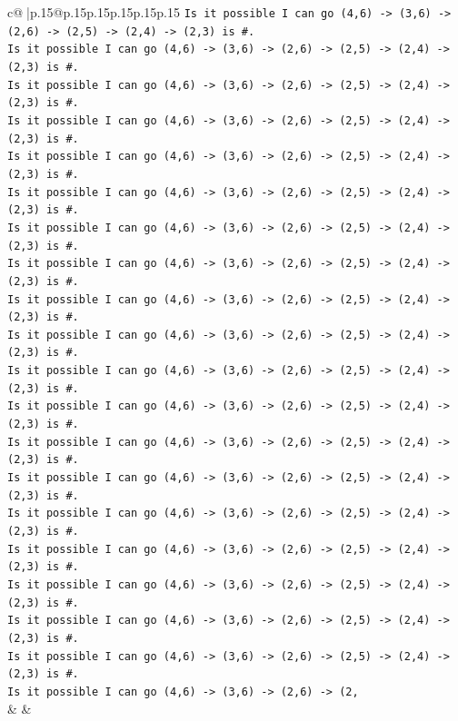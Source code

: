 \documentclass{article}
\begin{document}
{\begin{supertabular}{c@{$\;$}|p{.15\linewidth}@{}p{.15\linewidth}p{.15\linewidth}p{.15\linewidth}p{.15\linewidth}p{.15\linewidth}}
{{{\texttt{Is it possible I can go (4,6) {-}> (3,6) {-}> (2,6) {-}> (2,5) {-}> (2,4) {-}> (2,3) is \#.} \\
\texttt{Is it possible I can go (4,6) {-}> (3,6) {-}> (2,6) {-}> (2,5) {-}> (2,4) {-}> (2,3) is \#.} \\
\texttt{Is it possible I can go (4,6) {-}> (3,6) {-}> (2,6) {-}> (2,5) {-}> (2,4) {-}> (2,3) is \#.} \\
\texttt{Is it possible I can go (4,6) {-}> (3,6) {-}> (2,6) {-}> (2,5) {-}> (2,4) {-}> (2,3) is \#.} \\
\texttt{Is it possible I can go (4,6) {-}> (3,6) {-}> (2,6) {-}> (2,5) {-}> (2,4) {-}> (2,3) is \#.} \\
\texttt{Is it possible I can go (4,6) {-}> (3,6) {-}> (2,6) {-}> (2,5) {-}> (2,4) {-}> (2,3) is \#.} \\
\texttt{Is it possible I can go (4,6) {-}> (3,6) {-}> (2,6) {-}> (2,5) {-}> (2,4) {-}> (2,3) is \#.} \\
\texttt{Is it possible I can go (4,6) {-}> (3,6) {-}> (2,6) {-}> (2,5) {-}> (2,4) {-}> (2,3) is \#.} \\
\texttt{Is it possible I can go (4,6) {-}> (3,6) {-}> (2,6) {-}> (2,5) {-}> (2,4) {-}> (2,3) is \#.} \\
\texttt{Is it possible I can go (4,6) {-}> (3,6) {-}> (2,6) {-}> (2,5) {-}> (2,4) {-}> (2,3) is \#.} \\
\texttt{Is it possible I can go (4,6) {-}> (3,6) {-}> (2,6) {-}> (2,5) {-}> (2,4) {-}> (2,3) is \#.} \\
\texttt{Is it possible I can go (4,6) {-}> (3,6) {-}> (2,6) {-}> (2,5) {-}> (2,4) {-}> (2,3) is \#.} \\
\texttt{Is it possible I can go (4,6) {-}> (3,6) {-}> (2,6) {-}> (2,5) {-}> (2,4) {-}> (2,3) is \#.} \\
\texttt{Is it possible I can go (4,6) {-}> (3,6) {-}> (2,6) {-}> (2,5) {-}> (2,4) {-}> (2,3) is \#.} \\
\texttt{Is it possible I can go (4,6) {-}> (3,6) {-}> (2,6) {-}> (2,5) {-}> (2,4) {-}> (2,3) is \#.} \\
\texttt{Is it possible I can go (4,6) {-}> (3,6) {-}> (2,6) {-}> (2,5) {-}> (2,4) {-}> (2,3) is \#.} \\
\texttt{Is it possible I can go (4,6) {-}> (3,6) {-}> (2,6) {-}> (2,5) {-}> (2,4) {-}> (2,3) is \#.} \\
\texttt{Is it possible I can go (4,6) {-}> (3,6) {-}> (2,6) {-}> (2,5) {-}> (2,4) {-}> (2,3) is \#.} \\
\texttt{Is it possible I can go (4,6) {-}> (3,6) {-}> (2,6) {-}> (2,5) {-}> (2,4) {-}> (2,3) is \#.} \\
\texttt{Is it possible I can go (4,6) {-}> (3,6) {-}> (2,6) {-}> (2,} \\
            }
        }
    }
    & & \\ \\


\end{supertabular}}
\end{document}
